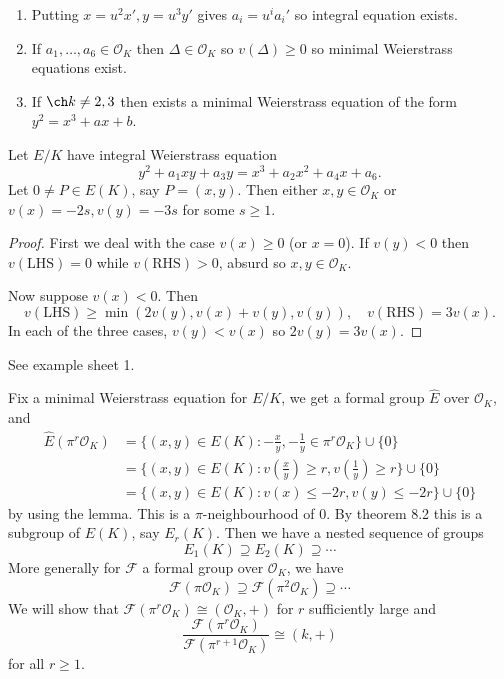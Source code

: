 \documentclass[a4paper]{article}
\theoremstyle{definition}
\renewcommand*{\O}{\mathcal{O}}
\begin{document}
\begin{remark}\leavevmode
  \begin{enumerate}
  \item Putting \(x = u^2 x', y = u^3 y'\) gives \(a_i = u^i a_i'\) so integral equation exists.
  \item If \(a_1, \dots, a_6 \in \O_K\) then \(\Delta \in \O_K\) so \(v(\Delta) \geq 0\) so minimal Weierstrass equations exist.
  \item If \(\ch k \neq 2, 3\) then exists a minimal Weierstrass equation of the form \(y^2 = x^3 + ax + b\).
  \end{enumerate}
\end{remark}

\begin{lemma}
  Let \(E/K\) have integral Weierstrass equation
  \[
    y^2 + a_1 xy + a_3 y = x^3 + a_2 x^2 + a_4x + a_6.
  \]
  Let \(0 \neq P \in E(K)\), say \(P = (x, y)\). Then either \(x, y \in \O_K\) or \(v(x) = -2s, v(y) = -3s\) for some \(s \geq 1\).
\end{lemma}

\begin{proof}
  First we deal with the case \(v(x) \geq 0\) (or \(x = 0\)). If \(v(y) < 0\) then \(v(\mathrm{LHS}) = 0\) while \(v(\mathrm{RHS}) > 0\), absurd so \(x, y \in \O_K\).

  Now suppose \(v(x) < 0\). Then
  \[
    v(\mathrm{LHS}) \geq \min(2 v(y), v(x) + v(y), v(y)), \quad v(\mathrm{RHS}) = 3v(x).
  \]
  In each of the three cases, \(v(y) < v(x)\) so \(2v(y) = 3v(x)\).
\end{proof}

\begin{remark}
  See example sheet 1.
\end{remark}

Fix a minimal Weierstrass equation for \(E/K\), we get a formal group \(\hat E\) over \(\O_K\), and
\begin{align*}
  \hat E (\pi^r \O_K)
  &= \{(x, y) \in E(K): -\frac{x}{y}, -\frac{1}{y} \in \pi^r \O_K\} \cup \{0\} \\
  &= \{(x, y) \in E(K): v(\frac{x}{y}) \geq r, v(\frac{1}{y}) \geq r\} \cup \{0\} \\
  &= \{(x, y) \in E(K): v(x) \leq -2r, v(y) \leq -2r\} \cup \{0\}
\end{align*}
by using the lemma. This is a \(\pi\)-neighbourhood of \(0\). By theorem 8.2 this is a subgroup of \(E(K)\), say \(E_r(K)\). Then we have a nested sequence of groups
\[
  E_1(K) \supseteq E_2(K) \supseteq \cdots
\]
More generally for \(\mathcal F\) a formal group over \(\O_K\), we have
\[
  \mathcal F(\pi \O_K) \supseteq \mathcal F(\pi^2 \O_K) \supseteq \cdots
\]
We will show that \(\mathcal F(\pi^r \O_K) \cong (\O_K, +)\) for \(r\) sufficiently large and
\[
  \frac{\mathcal F(\pi^r \O_K)}{\mathcal F (\pi^{r + 1} \O_K)} \cong (k, +)
\]
for all \(r \geq 1\).
\end{document}
